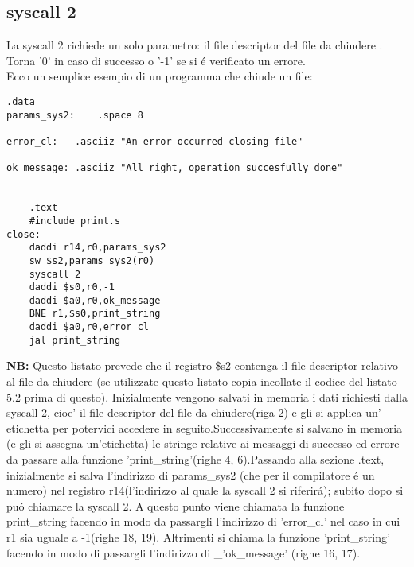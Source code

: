 \documentclass[12pt]{report}
\newcommand{\OF}{\textbf{NB:} Questo listato prevede che il registro \$s2 contenga il file descriptor
relativo al file da chiudere (se utilizzate questo listato copia-incollate il codice del listato 5.2 prima di questo).}
\begin{document}
\subsection{syscall 2}
La syscall 2 richiede un solo parametro: il file descriptor del file da chiudere .\\
Torna '0' in caso di successo o '-1' se si \'{e} verificato un errore.\\ 
Ecco un semplice esempio di un programma che chiude un file:
\begin{lstlisting}[caption={syscall2}, label={code:syscall2}, style={mips}]
      		.data
params_sys2:	.space 8

error_cl:	.asciiz "An error occurred closing file"

ok_message:	.asciiz "All right, operation succesfully done"						


	.text
	#include print.s	
close:	
	daddi r14,r0,params_sys2		
	sw $s2,params_sys2(r0)	
	syscall 2			
	daddi $s0,r0,-1		
	daddi $a0,r0,ok_message		
	BNE r1,$s0,print_string		
	daddi $a0,r0,error_cl	
	jal print_string			
\end{lstlisting}
\OF{}
Inizialmente vengono salvati in memoria i dati richiesti dalla syscall 2, cioe'  il file descriptor del file da chiudere(riga 2) e gli si applica un' etichetta
 per potervici accedere in seguito.Successivamente si salvano in memoria (e gli si assegna un'etichetta) le stringe relative ai messaggi 
di successo ed errore da passare alla funzione 'print_string'(righe 4, 6).Passando alla sezione .text, inizialmente si salva l'indirizzo di params_sys2
(che per il compilatore \'{e} un numero) nel registro r14(l'indirizzo al quale la syscall 2 si riferir\'{a}); subito dopo si pu\'{o} chiamare la syscall 2.
A questo punto viene chiamata la funzione print_string facendo in modo da passargli l'indirizzo di 'error_cl' nel caso in cui r1 sia uguale a -1(righe 18, 19).
Altrimenti si chiama la funzione 'print_string' facendo in modo di passargli l'indirizzo di _'ok_message' (righe 16, 17).
\end{document}
